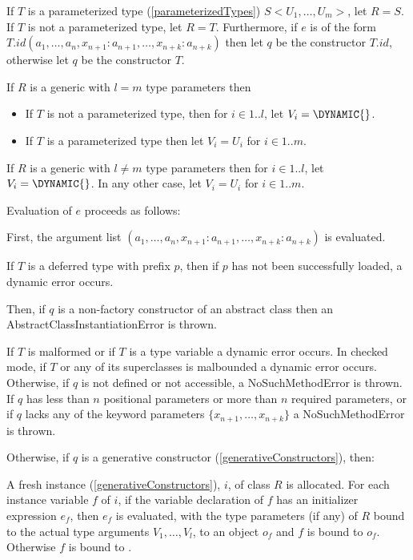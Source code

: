 \documentclass{article}
\newcommand{\code}[1]{{\sf #1}}
\begin{document}
\LMHash{}
If $T$ is a parameterized type (\ref{parameterizedTypes}) $S<U_1,  \ldots, U_m>$, let $R = S$.
If $T$ is not a parameterized type, let $R = T$.
Furthermore, if $e$ is of the form \NEW{} $T.id(a_1, \ldots , a_n, x_{n+1}: a_{n+1}, \ldots , x_{n+k}: a_{n+k})$ then let  $q$ be the constructor  $T.id$, otherwise let $q$ be the constructor $T$.

\LMHash{}
If $R$ is a generic with $l = m$ type parameters then
\begin{itemize}
\item  If $T$ is not a parameterized type, then for $ i \in 1 .. l$, let $V_i =  \DYNAMIC{}$.
\item  If $T$ is  a parameterized type then let $V_i = U_i$ for $ i \in 1 .. m$.
\end{itemize}

\LMHash{}
If $R$ is a generic with $l \ne m$ type parameters then for $ i \in 1 .. l$, let $V_i =  \DYNAMIC{}$. In any other case, let $V_i = U_i$ for $ i \in 1 .. m$.

\LMHash{}
Evaluation of $e$ proceeds as follows:

\LMHash{}
First, the argument list $(a_1, \ldots , a_n, x_{n+1}: a_{n+1}, \ldots , x_{n+k}: a_{n+k})$ is evaluated.

\LMHash{}
If $T$ is a deferred type with prefix $p$, then if $p$ has not been successfully loaded, a dynamic error occurs.

\LMHash{}
Then, if $q$ is a non-factory constructor of an abstract class then an \code{AbstractClassInstantiationError} is thrown.

\LMHash{}
If $T$  is malformed or if $T$ is a type variable a dynamic error occurs. In checked mode, if $T$ or any of its superclasses is malbounded a dynamic error occurs.
 Otherwise, if $q$ is not defined or not accessible, a \code{NoSuchMethodError} is thrown.  If $q$ has  less than $n$ positional parameters or more than $n$ required parameters, or if $q$ lacks any of the keyword parameters $\{ x_{n+1}, \ldots, x_{n+k}\}$ a \code{NoSuchMethodError} is thrown.

\LMHash{}
Otherwise, if $q$ is a generative constructor (\ref{generativeConstructors}), then:


\LMHash{}
A fresh instance (\ref{generativeConstructors}), $i$,  of class $R$ is allocated. For each instance variable $f$ of $i$,  if the variable declaration of $f$ has an initializer expression $e_f$, then $e_f$ is evaluated, with the type parameters (if any) of $R$ bound to the actual type arguments $V_1, \ldots, V_l$, to an object $o_f$ and $f$ is bound to $o_f$. Otherwise $f$ is bound to \NULL{}.
\end{document}
